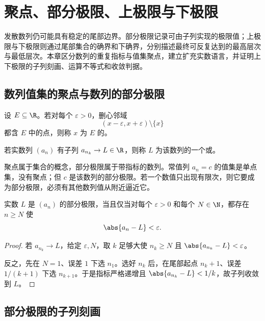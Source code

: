 \chapter{聚点、部分极限、上极限与下极限}
\label{chap:limsup-liminf}

\begin{chapterguide}
发散数列仍可能具有稳定的尾部边界。部分极限记录可由子列实现的极限值；上极限与下极限则通过尾部集合的确界和下确界，分别描述最终可反复达到的最高层次与最低层次。本章区分数列的重复指标与值集聚点，建立扩充实数语言，并证明上下极限的子列刻画、运算不等式和收敛判据。
\end{chapterguide}

\section{数列值集的聚点与数列的部分极限}

\begin{definition}
设 \(E\subseteq\R\)。若对每个 \(\varepsilon>0\)，删心邻域
\[
 (x-\varepsilon,x+\varepsilon)\setminus\{x\}
\]
都含 \(E\) 中的点，则称 \(x\) 为 \(E\) 的。
\end{definition}

\begin{definition}
若实数列 \((a_n)\) 有子列 \(a_{n_k}\to L\in\R\)，则称 \(L\) 为该数列的一个或。
\end{definition}

聚点属于集合的概念，部分极限属于带指标的数列。常值列 \(a_n=c\) 的值集是单点集，没有聚点；但 \(c\) 是该数列的部分极限。若一个数值只出现有限次，则它要成为部分极限，必须有其他数列值从附近逼近它。

\begin{proposition}
实数 \(L\) 是 \((a_n)\) 的部分极限，当且仅当对每个 \(\varepsilon>0\) 和每个 \(N\in\N\)，都存在 \(n\ge N\) 使
\[
 \abs{a_n-L}<\varepsilon.
\]
\end{proposition}

\begin{proof}
若 \(a_{n_k}\to L\)，给定 \(\varepsilon,N\)，取 \(k\) 足够大使
\(n_k\ge N\) 且 \(\abs{a_{n_k}-L}<\varepsilon\)。

反之，先在 \(N=1\)、误差 \(1\) 下选 \(n_1\)。选好 \(n_k\) 后，在尾部起点 \(n_k+1\)、误差 \(1/(k+1)\) 下选 \(n_{k+1}\)。于是指标严格递增且
\(\abs{a_{n_k}-L}<1/k\)，故子列收敛到 \(L\)。
\end{proof}

\section{部分极限的子列刻画}

